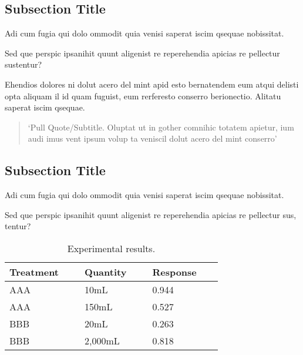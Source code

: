 \documentclass[
	landscape,       %
]{ImperialPoster}
\begin{document}

\titlesection{} %

\medskip %

\begin{multicols}{4} %


	\subsection{Subsection Title}

	Adi cum fugia qui dolo ommodit quia venisi saperat iscim qsequae nobissitat.

	Sed que perspic ipsanihit quunt aligenist re reperehendia \textcolor{ICLBlue}{apicias re pellectur sustentur?}

	Ehendios \textcolor{ICLBlue}{dolores} ni dolut acero del mint apid esto bernatendem eum \textcolor{ICLBlue}{atqui delisti opta} aliquam il id quam fuguist, eum rerferesto conserro berionectio. Alitatu saperat iscim qsequae.

	\begin{quote}
		`Pull Quote/Subtitle. Oluptat ut in gother comnihic totatem apietur, ium audi imus vent ipsum volup ta veniscil dolut acero del mint conserro'
	\end{quote}

	\subsection{Subsection Title}

	Adi cum fugia qui dolo ommodit quia venisi saperat iscim qsequae nobissitat.

	Sed que perspic ipsanihit quunt aligenist re reperehendia apicias re pellectur sus, tentur?

	\begin{table}[H] %
		\caption{Experimental results.}
		\begin{tabular}{L{0.24\linewidth} C{0.24\linewidth} R{0.24\linewidth}}
			\toprule
			Treatment & Quantity & Response\\
			\midrule
			AAA & 10mL & 0.944\\
			AAA & 150mL & 0.527\\
			BBB & 20mL & 0.263\\
			BBB & 2,000mL & 0.818\\
			\bottomrule
		\end{tabular}
	\end{table}


\end{multicols}
\end{document}
